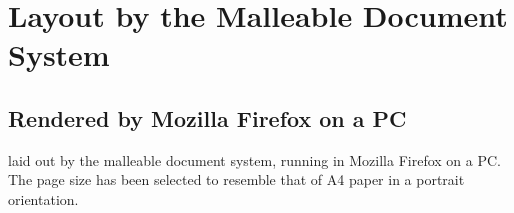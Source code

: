 \newpage

\section{Layout by the Malleable Document System}

\newlength{\imgwid}

\subsection{Rendered by Mozilla Firefox on a PC}
\label{app:layout-ff}

\cite{Pinkney2011} laid out by the malleable document system, running in Mozilla Firefox on a PC. The page size has been selected to resemble that of A4 paper in a portrait orientation.

\begin{center}
\setlength{\imgwid}{0.47\textwidth}
\hspace{0.01\textwidth}

\end{center}
